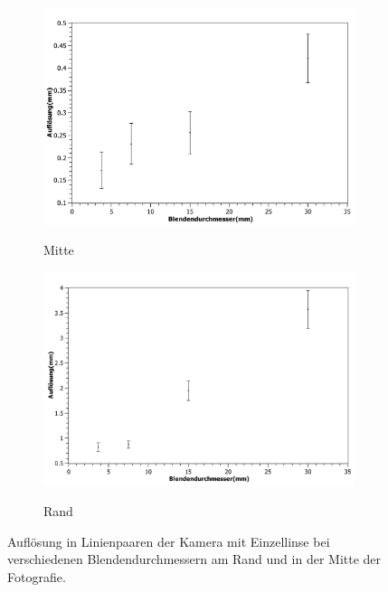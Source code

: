 \documentclass[
	a4paper,
	12pt,
	pagesize,
	ngerman
]{scrartcl}
\begin{document}
	\begin{figure}[H] %
		\centering
		\begin{subfigure}[t]{0.5\textwidth}
			\centering
			\includegraphics[width=1\textwidth]{fig_Einzellinse_mitte_aufloesung}
			\label{fig_aufl_mitte}
			\caption{Mitte}
		\end{subfigure}%
		\begin{subfigure}[t]{0.5\textwidth}
			\centering
			\includegraphics[width=1\textwidth]{fig_Einzellinse_rand_aufloesung}
			\label{fig_aufl_rand}
			\caption{Rand}
		\end{subfigure}
		\caption{
			\label{fig_aufl}
			Auflösung in Linienpaaren der Kamera mit Einzellinse bei verschiedenen Blendendurchmessern am Rand und in der Mitte der Fotografie.}
		\centering
		
	\end{figure}
	
\end{document}
